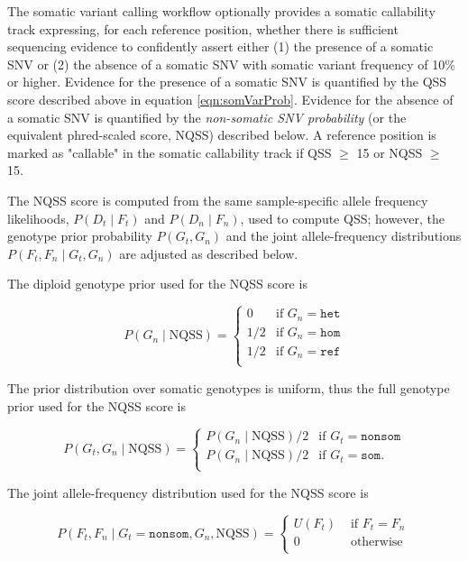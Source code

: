 \documentclass{article}
\begin{document}
The somatic variant calling workflow optionally provides a somatic callability track expressing, for each reference position, whether there is sufficient sequencing evidence to confidently assert either (1) the presence of a somatic SNV or (2) the absence of a somatic SNV with somatic variant frequency of 10\% or higher. Evidence for the presence of a somatic SNV is quantified by the QSS score described above in equation \ref{eqn:somVarProb}. Evidence for the absence of a somatic SNV is quantified by the \emph{non-somatic SNV probability} (or the equivalent phred-scaled score, NQSS) described below. A reference position is marked as "callable" in the somatic callability track if QSS $\ge$ 15 or NQSS $\ge$ 15.

The NQSS score is computed from the same sample-specific allele frequency likelihoods, $P(D_t \mid F_t)$ and $P(D_n \mid F_n)$, used to compute QSS; however, the genotype prior probability $P(G_t, G_n)$ and the joint allele-frequency distributions $P(F_t,F_n \mid G_t,G_n)$ are adjusted as described below.

The diploid genotype prior used for the NQSS score is

\begin{equation*}
P(G_n\mid \text{NQSS})=
\begin{cases}
0 & \text{if } G_n = \texttt{het} \\
1/2 & \text{if } G_n = \texttt{hom} \\
1/2 & \text{if } G_n = \texttt{ref} \\
\end{cases}
\end{equation*}

The prior distribution over somatic genotypes is uniform, thus the full genotype prior used for the NQSS score is

\begin{equation*}
P(G_t, G_n \mid \text{NQSS}) =
\begin{cases}
P(G_n \mid \text{NQSS})/2 & \text{if } G_t = \texttt{nonsom} \\
P(G_n \mid \text{NQSS})/2 & \text{if } G_t = \texttt{som}. \\
\end{cases}
\end{equation*}


The joint allele-frequency distribution used for the NQSS score is

\begin{equation*}
P(F_t, F_n \mid G_t = \texttt{nonsom}, G_n, \text{NQSS})=
\begin{cases}
U(F_t) & \text{ if } F_t = F_n \\
0 & \text{ otherwise } \\
\end{cases}
\end{equation*}
\end{document}
